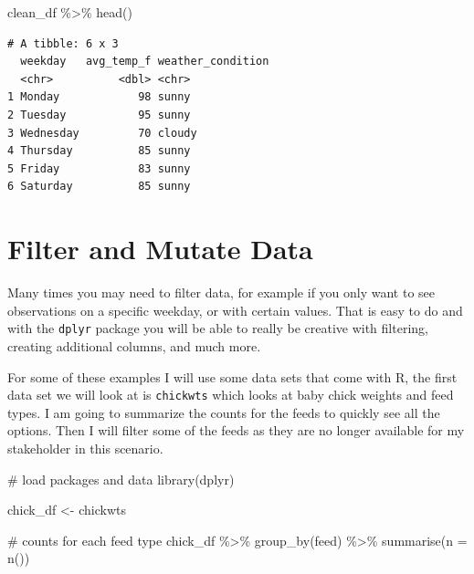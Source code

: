 \documentclass[
  letterpaper,
  DIV=11,
  numbers=noendperiod]{scrreprt}
\newenvironment{Shaded}{\begin{snugshade}}{\end{snugshade}}
\newcommand{\AttributeTok}[1]{\textcolor[rgb]{0.40,0.45,0.13}{#1}}
\newcommand{\CommentTok}[1]{\textcolor[rgb]{0.37,0.37,0.37}{#1}}
\newcommand{\FunctionTok}[1]{\textcolor[rgb]{0.28,0.35,0.67}{#1}}
\newcommand{\NormalTok}[1]{\textcolor[rgb]{0.00,0.23,0.31}{#1}}
\newcommand{\OtherTok}[1]{\textcolor[rgb]{0.00,0.23,0.31}{#1}}
\newcommand{\SpecialCharTok}[1]{\textcolor[rgb]{0.37,0.37,0.37}{#1}}
\begin{document}
\begin{Shaded}
\begin{Highlighting}[]
\NormalTok{clean\_df }\SpecialCharTok{\%\textgreater{}\%}
  \FunctionTok{head}\NormalTok{()}
\end{Highlighting}
\end{Shaded}

\begin{verbatim}
# A tibble: 6 x 3
  weekday   avg_temp_f weather_condition
  <chr>          <dbl> <chr>            
1 Monday            98 sunny            
2 Tuesday           95 sunny            
3 Wednesday         70 cloudy           
4 Thursday          85 sunny            
5 Friday            83 sunny            
6 Saturday          85 sunny            
\end{verbatim}

\hypertarget{filter-and-mutate-data}{%
\section{Filter and Mutate Data}\label{filter-and-mutate-data}}

Many times you may need to filter data, for example if you only want to
see observations on a specific weekday, or with certain values. That is
easy to do and with the \texttt{dplyr} package you will be able to
really be creative with filtering, creating additional columns, and much
more.

For some of these examples I will use some data sets that come with R,
the first data set we will look at is \texttt{chickwts} which looks at
baby chick weights and feed types. I am going to summarize the counts
for the feeds to quickly see all the options. Then I will filter some of
the feeds as they are no longer available for my stakeholder in this
scenario.

\begin{Shaded}
\begin{Highlighting}[]
\CommentTok{\# load packages and data }
\FunctionTok{library}\NormalTok{(dplyr)}

\NormalTok{chick\_df }\OtherTok{\textless{}{-}}\NormalTok{ chickwts}

\CommentTok{\# counts for each feed type}
\NormalTok{chick\_df }\SpecialCharTok{\%\textgreater{}\%}
  \FunctionTok{group\_by}\NormalTok{(feed) }\SpecialCharTok{\%\textgreater{}\%}
  \FunctionTok{summarise}\NormalTok{(}\AttributeTok{n =} \FunctionTok{n}\NormalTok{())}
\end{Highlighting}
\end{Shaded}
\end{document}
